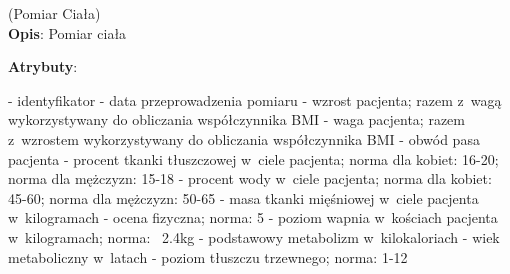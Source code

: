 \begin{enumerate}[label={\textbf{KAT/3/\protect\twodigits{\theenumi}}}, wide, labelwidth=!, labelindent=0pt, labelsep=0pt, series=reqs]
    \label{kat:BodyMeasurement} (Pomiar Ciała)\\
    \indent\textbf{Opis}: Pomiar ciała
    \par
    \textbf{Atrybuty}:
    \begin{itemize}[series=atr, wide, align=left, leftmargin=190pt]
        \label{kat:BodyMeasurement:id}- identyfikator
        \label{kat:BodyMeasurement:completionDate}- data przeprowadzenia pomiaru
        \label{kat:BodyMeasurement:height}- wzrost pacjenta; razem z~wagą wykorzystywany do obliczania współczynnika BMI
        \label{kat:BodyMeasurement:weight}- waga pacjenta; razem z~wzrostem wykorzystywany do obliczania współczynnika BMI
        \label{kat:BodyMeasurement:waist}- obwód pasa pacjenta
        \label{kat:BodyMeasurement:percentOfFatTissue}- procent tkanki tłuszczowej w~ciele pacjenta; norma dla kobiet: 16-20; norma dla mężczyzn: 15-18
        \label{kat:BodyMeasurement:percentOfWater}- procent wody w~ciele pacjenta; norma dla kobiet: 45-60; norma dla mężczyzn: 50-65
        \label{kat:BodyMeasurement:muscleMass}- masa tkanki mięśniowej w~ciele pacjenta w~kilogramach
        \label{kat:BodyMeasurement:physicalMark}- ocena fizyczna; norma: 5
        \label{kat:BodyMeasurement:calciumInBones}- poziom wapnia w~kościach pacjenta w~kilogramach; norma: ~2.4kg
        \label{kat:BodyMeasurement:basicMetabolism}- podstawowy metabolizm w~kilokaloriach
        \label{kat:BodyMeasurement:metabolicAge}- wiek metaboliczny w~latach
        \label{kat:BodyMeasurement:visceralFatLevel}- poziom tłuszczu trzewnego; norma: 1-12
    \end{itemize}


\end{enumerate}
